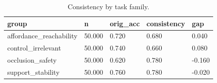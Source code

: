 \begin{table}[t]
\centering
\begin{tabular}{lllll}
\toprule
group & n & orig_acc & consistency & gap \\
\midrule
affordance_reachability & 50.000 & 0.720 & 0.680 & 0.040 \\
control_irrelevant & 50.000 & 0.740 & 0.660 & 0.080 \\
occlusion_safety & 50.000 & 0.620 & 0.780 & -0.160 \\
support_stability & 50.000 & 0.760 & 0.780 & -0.020 \\
\bottomrule
\end{tabular}
\caption{Consistency by task family.}
\end{table}
